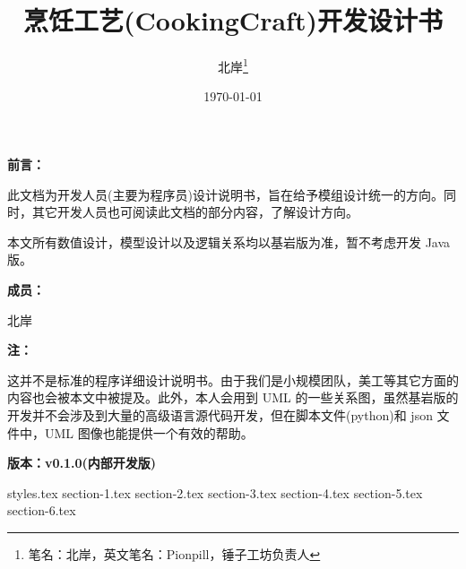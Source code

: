 \documentclass{PionpillNote-art}
\title{烹饪工艺(CookingCraft)开发设计书}
\author{
    北岸\footnote{笔名：北岸，英文笔名：Pionpill，锤子工坊负责人}
}
\date{\today}
\begin{document}
\maketitle                  %

\vspace{2cm}
\noindent\textbf{前言：}

此文档为开发人员(主要为程序员)设计说明书，旨在给予模组设计统一的方向。同时，其它开发人员也可阅读此文档的部分内容，了解设计方向。

本文所有数值设计，模型设计以及逻辑关系均以基岩版为准，暂不考虑开发 Java 版。

\noindent\textbf{成员：}

北岸

\noindent\textbf{注：}

这并不是标准的程序详细设计说明书。由于我们是小规模团队，美工等其它方面的内容也会被本文中被提及。此外，本人会用到 UML 的一些关系图，虽然基岩版的开发并不会涉及到大量的高级语言源代码开发，但在脚本文件(python)和 json 文件中，UML 图像也能提供一个有效的帮助。

\hfill \textbf{版本：v0.1.0(内部开发版)}


\newpage
\tableofcontents            %
\thispagestyle{empty}
\newpage
\setcounter{page}{1}

{styles.tex}
{section-1.tex}
{section-2.tex}
{section-3.tex}
{section-4.tex}
{section-5.tex}
{section-6.tex}

\end{document}
